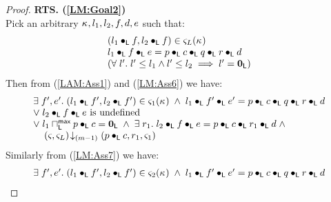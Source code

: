 \begin{lemma}[]
\begin{proof}
\noindent\textbf{RTS. (\ref{LM:Goal2})}\\
Pick an arbitrary $\kappa_{}, l_1, l_2, f, d, e$ such that:
%
\begin{align}
	\begin{array}{l}
		(l_1 \bullet_{\textsf{L}} f, l_2 \bullet_{\textsf{L}} f) \in \varsigma_{L}(\kappa_{})\\
		l_1 \bullet_{\textsf{L}} f \bullet_{\textsf{L}} e =  p \bullet_{\textsf{L}} c \bullet_{\textsf{L}} q \bullet_{\textsf{L}} r \bullet_{\textsf{L}} d\\
  	\left(\forall\; l'.\; l' \leq l_1 \land l' \leq l_2 \implies l' = \mathbf{0}_{\textsf{L}}\right)\\
	\end{array} \label{LAM:Ass1}
\end{align} 
%
Then from (\ref{LAM:Ass1}) and (\ref{LM:Ass6}) we have:
%
\begin{align}
	\begin{array}{l}
		\exists\; f', e'.\; (l_1 \bullet_{\textsf{L}} f', l_2 \bullet_{\textsf{L}} f') \in \varsigma_{1}(\kappa_{}) \;\land\; l_1 \bullet_{\textsf{L}} f' \bullet_{\textsf{L}} e' =  p \bullet_{\textsf{L}} c \bullet_{\textsf{L}} q \bullet_{\textsf{L}} r \bullet_{\textsf{L}} d\\
		\lor\;l_2 \bullet_{\textsf{L}} f \bullet_{\textsf{L}} e \text{ is undefined}\\
		\lor\; l_1 \sqcap_{\textsf{L}}^{\textsf{max}} p \bullet_{\textsf{L}} c = \mathbf{0}_{\textsf{L}} \;\land\; \exists\; r_1.\; l_2 \bullet_{\textsf{L}} f \bullet_{\textsf{L}} e = p \bullet_{\textsf{L}} c \bullet_{\textsf{L}} r_1 \bullet_{\textsf{L}} d \;\land\\
		\hspace*{0.4cm} \left(\varsigma_{}, \varsigma_{L}\right) \!\downarrow_{(m-1)} \left(p \bullet_{\textsf{L}} c, r_1, \varsigma_{1} \right)
	\end{array} \label{LM:Ass29}
\end{align}
%
Similarly from (\ref{LM:Ass7}) we have:
%
\begin{align}
	\begin{array}{l}
	\exists\; f', e'.\; (l_1 \bullet_{\textsf{L}} f', l_2 \bullet_{\textsf{L}} f') \in \varsigma_{2}(\kappa_{}) \;\land\; l_1 \bullet_{\textsf{L}} f' \bullet_{\textsf{L}} e' =  p \bullet_{\textsf{L}} c \bullet_{\textsf{L}} q \bullet_{\textsf{L}} r \bullet_{\textsf{L}} d\\

\end{array}
\end{align}
\end{proof}
\end{lemma}
